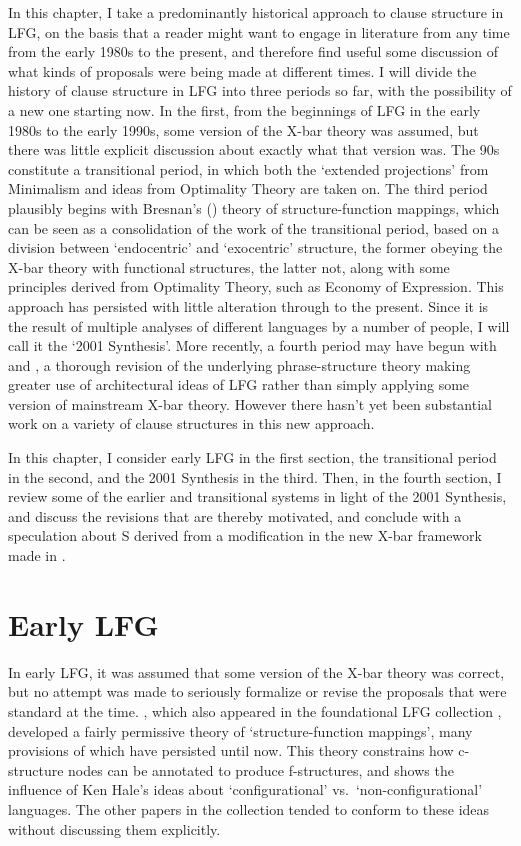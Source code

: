 \documentclass[output=paper,hidelinks]{langscibook}
\begin{document}
In this chapter, I take a predominantly historical approach to clause structure
in LFG, on the basis that a reader might want to engage in literature from any time
from the early 1980s to the present, and therefore find useful some discussion of what
kinds of proposals were being made at different times.
I will divide the history of clause structure in LFG into three periods so far,
with the possibility of a new one starting now.  In the first, from the
beginnings of LFG in the early 1980s to the early 1990s, some version of the
X-bar theory was assumed, but there was little explicit discussion about
exactly what that version was.  The 90s constitute a transitional period, in which both
the `extended projections' from Minimalism and ideas from Optimality Theory are
taken on.  The third period plausibly begins with Bresnan's
(\citeyear{bresnan2001lexical}) theory of structure-function mappings, which can be seen
as a consolidation of the work of the transitional period, based on a division
between `endocentric' and `exocentric' structure, the former obeying the X-bar
theory with functional structures, the latter not, along with some principles
derived from Optimality Theory, such as Economy of Expression.  This approach
has persisted with little alteration through \citet{BresnanEtAl2016} to the
present.
Since it is the result of multiple analyses of different languages by a number
of people, I will call it the `2001 Synthesis'.  More recently, a fourth
period may have begun with \citet{low:lov:20} and \citet{Lovestrand2022},
a thorough revision of
the underlying phrase-structure theory making greater use of architectural ideas
of LFG rather than simply applying some version of mainstream X-bar theory.  However
there hasn't yet been substantial work on a variety of
clause structures in this new approach.

In this chapter, I consider early LFG in the first section, the transitional
period in the second, and the 2001 Synthesis in the third.  Then, in the fourth
section, I review some of the earlier and transitional systems in light
of the 2001 Synthesis, and discuss the revisions that are thereby motivated,
and conclude with a speculation about S derived from a modification
in the new X-bar framework made in \citet{Lovestrand2022}.

\section{Early LFG}\label{earlyLFG}
In early LFG, it was assumed that some version of the X-bar theory was correct,
but no attempt was made to seriously formalize or revise the proposals that were standard
at the time. \citet[354-356]{bresnan1982control-complementation}, which also appeared in the foundational LFG collection
 \citet{bresnan82}, developed a fairly permissive theory of ‘structure-function mappings’,
many provisions of which have persisted until now.  This theory constrains how c-structure
nodes can be annotated to produce f-structures, and shows the influence of Ken Hale’s ideas
about `configurational’ vs.\ `non-configurational' languages. The other papers in
the \citeyear{bresnan82} collection tended to conform to these ideas without discussing them explicitly.
\end{document}
